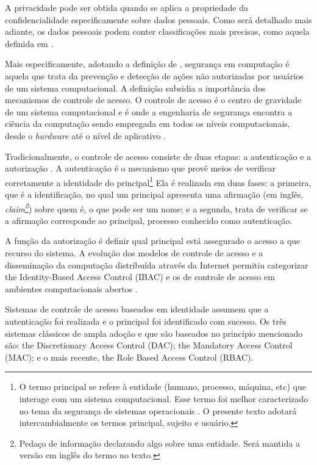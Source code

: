 \documentclass{doublecol-new}
\begin{document}
A privacidade pode ser obtida quando se aplica a propriedade da confidencialidade especificamente sobre dados pessoais. Como será detalhado mais adiante, os dados pessoais podem conter classificações mais precisas, como aquela definida em \cite{heurix2015taxonomy}.

Mais especificamente, adotando a definição de  \cite{gollmann2011compsecurity}, segurança em computação é aquela que trata da prevenção e detecção de ações não autorizadas por usuários de um sistema computacional. A definição subsidia a importância dos mecanismos de controle de acesso. O controle de acesso é o centro de gravidade de um sistema computacional e é onde a engenharia de segurança encontra a ciência da computação sendo empregada em todos os níveis computacionais, desde o \textit{hardware} até o nível de aplicativo \cite{anderson2008security}.

Tradicionalmente, o controle de acesso consiste de duas etapas: a autenticação e a autorização \cite{gollmann2011compsecurity}. A autenticação é o mecanismo que provê meios de verificar corretamente a identidade do principal\footnote{O termo principal se refere à entidade (humano, processo, máquina, etc) que interage com um sistema computacional. Esse termo foi melhor caracterizado no tema da segurança de sistemas operacionais \cite{gollmann2011compsecurity}. O presente texto adotará intercambialmente os termos principal, sujeito e usuário.} Ela é realizada em duas fases: a primeira, que é a identificação, no qual um principal apresenta uma afirmação (em inglês, \textit{claim\footnote{Pedaço de informação declarando algo sobre uma entidade. Será mantida a versão em inglês do termo no texto.}}) sobre quem é, o que pode ser um nome; e a segunda, trata de verificar se a afirmação corresponde ao principal, processo conhecido como autenticação. 

A função da autorização é definir qual principal está assegurado o acesso a que recurso do sistema. A evolução dos modelos de controle de acesso e a disseminação da computação distribuída através da Internet permitiu categorizar the Identity-Based Access Control (IBAC) e os de controle de acesso em ambientes computacionais abertos \cite{gollmann2011compsecurity}.

Sistemas de controle de acesso baseados em identidade assumem que a autenticação foi realizada e o principal foi identificado com sucesso. Os três sistemas clássicos de ampla adoção e que são baseados no princípio mencionado são: the Discretionary Access Control (DAC); the Mandatory Access Control (MAC); e o mais recente, the Role Based Access Control (RBAC).
\end{document}
